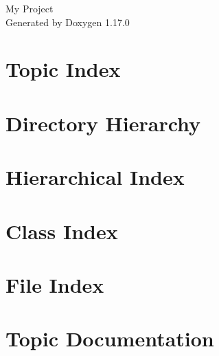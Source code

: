 \documentclass[twoside]{book}
\newcommand{\+}{\discretionary{\mbox{\scriptsize$\hookleftarrow$}}{}{}}
\newcommand{\clearemptydoublepage}{%
    \newpage{\pagestyle{empty}\cleardoublepage}%
  }
\begin{document}
  \raggedbottom
    \hypersetup{pageanchor=false,
                bookmarksnumbered=true,
                pdfencoding=unicode
               }
  \begin{titlepage}
  \vspace*{7cm}
  \begin{center}%
  {\Large My Project}\\
  \vspace*{1cm}
  {\large Generated by Doxygen 1.17.0}\\
  \end{center}
  \end{titlepage}
  \clearemptydoublepage
  \tableofcontents
  \clearemptydoublepage
  \hypersetup{pageanchor=true}






\chapter{Topic Index}

\chapter{Directory Hierarchy}

\chapter{Hierarchical Index}

\chapter{Class Index}

\chapter{File Index}

\chapter{Topic Documentation}





\end{document}
